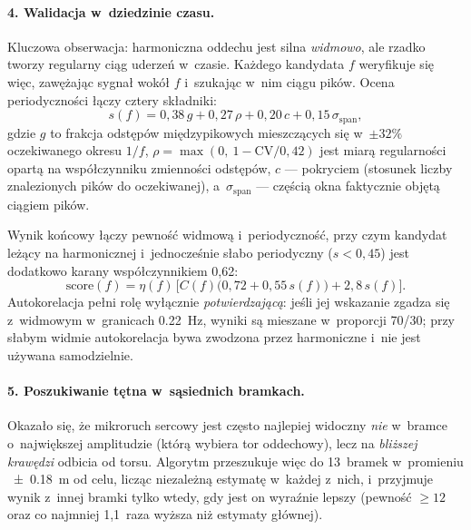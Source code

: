 \documentclass[12pt,a4paper,oneside]{report}
\begin{document}
\paragraph{4. Walidacja w~dziedzinie czasu.}
Kluczowa obserwacja: harmoniczna oddechu jest silna \emph{widmowo}, ale rzadko
tworzy regularny ciąg uderzeń w~czasie. Każdego kandydata $f$ weryfikuje się
więc, zawężając sygnał wokół $f$ i~szukając w~nim ciągu pików. Ocena
periodyczności łączy cztery składniki:
\begin{equation}
  s(f) = 0{,}38\,g + 0{,}27\,\rho + 0{,}20\,c + 0{,}15\,\sigma_{\text{span}},
  \label{eq:periodycznosc}
\end{equation}
gdzie $g$ to frakcja odstępów międzypikowych mieszczących się w~$\pm32\%$
oczekiwanego okresu $1/f$, $\rho = \max(0,\ 1 - \mathrm{CV}/0{,}42)$ jest miarą
regularności opartą na współczynniku zmienności odstępów, $c$ --- pokryciem
(stosunek liczby znalezionych pików do oczekiwanej), a~$\sigma_{\text{span}}$
--- częścią okna faktycznie objętą ciągiem pików.

Wynik końcowy łączy pewność widmową i~periodyczność, przy czym kandydat
leżący na harmonicznej i~jednocześnie słabo periodyczny ($s < 0{,}45$) jest
dodatkowo karany współczynnikiem 0{,}62:
\begin{equation}
  \mathrm{score}(f) = \eta(f)\,\Big[ C(f)\big(0{,}72 + 0{,}55\,s(f)\big) + 2{,}8\,s(f) \Big].
  \label{eq:fuzja}
\end{equation}
Autokorelacja pełni rolę wyłącznie \emph{potwierdzającą}: jeśli jej wskazanie
zgadza się z~widmowym w~granicach \SI{0.22}{Hz}, wyniki są mieszane w~proporcji
70/30; przy słabym widmie autokorelacja bywa zwodzona przez harmoniczne i~nie
jest używana samodzielnie.

\paragraph{5. Poszukiwanie tętna w~sąsiednich bramkach.}
Okazało się, że mikroruch sercowy jest często najlepiej widoczny \emph{nie}
w~bramce o~największej amplitudzie (którą wybiera tor oddechowy), lecz na
\emph{bliższej krawędzi} odbicia od torsu. Algorytm przeszukuje więc do
13~bramek w~promieniu \SI{\pm 0.18}{m} od celu, licząc niezależną estymatę
w~każdej z~nich, i~przyjmuje wynik z~innej bramki tylko wtedy, gdy jest on
wyraźnie lepszy (pewność $\geq 12$ oraz co najmniej 1,1~raza wyższa niż
estymaty głównej).
\end{document}
